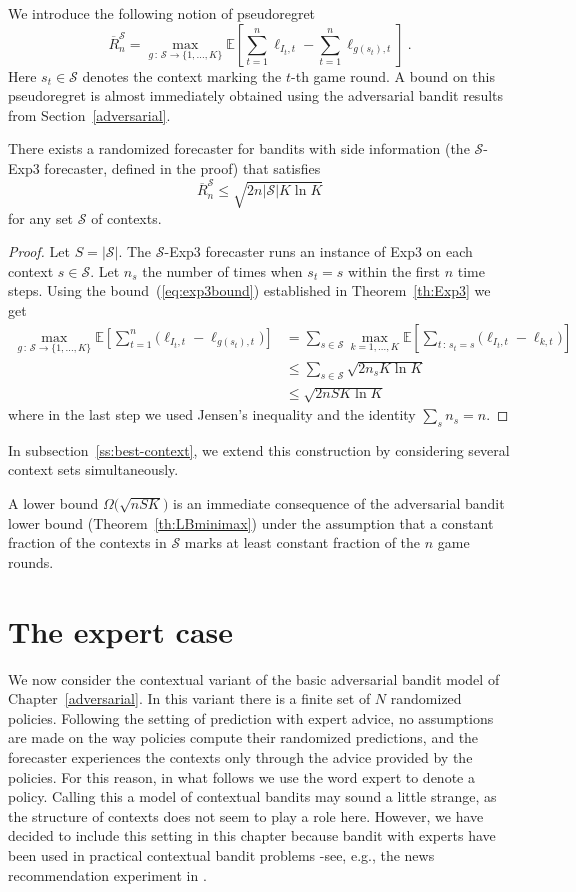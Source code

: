 \documentclass[11pt]{hackednow}
\newcommand{\E}{\mathbb{E}}
\newcommand{\cS}{\mathcal{S}}
\newcommand{\oR}{\overline{R}}
\newcommand{\oRS}{\oR^{\cS}}
\begin{document}
We introduce the following notion of pseudoregret
\[
	\oRS_n = \max_{g \,:\, \cS\to\{1,\dots,K\}} \E\left[ \sum_{t=1}^n \ell_{I_t,t} - \sum_{t=1}^n \ell_{g(s_t),t} \right]~.
\]
Here $s_t\in\cS$ denotes the context marking the $t$-th game round. A bound on this pseudoregret is almost immediately obtained using the adversarial bandit results from Section~\ref{adversarial}. 
\begin{theorem}
\label{th:context-simple}
There exists a randomized forecaster for bandits with side information (the $\cS$-Exp3 forecaster, defined in the proof) that satisfies
\[
	\oRS_n \le \sqrt{2n |\cS| K\ln K}
\]
for any set $\cS$ of contexts.
\end{theorem}
\begin{proof}
Let $S = |\cS|$.
The $\cS$-Exp3 forecaster runs an instance of Exp3 on each context $s\in\cS$. Let $n_s$ the number of times when $s_t=s$ within the first $n$ time steps. Using the bound~(\ref{eq:exp3bound}) established in Theorem~\ref{th:Exp3} we get
\begin{align*}
	\max_{g \,:\, \cS\to\{1,\dots,K\}} \E\left[ \sum_{t=1}^n \bigl(\ell_{I_t,t} - \ell_{g(s_t),t}\bigr) \right]
&=
	\sum_{s\in\cS} \max_{k=1,\dots,K} \E\left[ \sum_{t \,:\, s_t=s} \bigl(\ell_{I_t,t} - \ell_{k,t} \bigr)\right]
\\ &\le
	\sum_{s\in\cS} \sqrt{2 n_s K\ln K}
\\ &\le
	\sqrt{2 n S K\ln K}
\end{align*}
where in the last step we used Jensen's inequality and the identity $\sum_s n_s = n$.
\end{proof}
In subsection~\ref{ss:best-context}, we extend this construction by considering several context sets simultaneously.

A lower bound $\Omega\bigl(\sqrt{nSK}\bigl)$ is an immediate consequence of the adversarial bandit lower bound (Theorem~\ref{th:LBminimax}) under the assumption that a constant fraction of the contexts in $\cS$ marks at least constant fraction of the $n$ game rounds.


\section{The expert case}
\label{s:context-adv}
We now consider the contextual variant of the basic adversarial bandit model of Chapter~\ref{adversarial}. In this variant there is a finite set of $N$ randomized policies. Following the setting of prediction with expert advice, no assumptions are made on the way policies compute their randomized predictions, and the forecaster experiences the contexts only through the advice provided by the policies. For this reason, in what follows we use the word expert to denote a policy. Calling this a model of contextual bandits may sound a little strange, as the structure of contexts does not seem to play a role here. However, we have decided to include this setting in this chapter because bandit with experts have been used in practical contextual bandit problems -see, e.g., the news recommendation experiment in \cite{beygelzimer2010contextual}.
\end{document}
